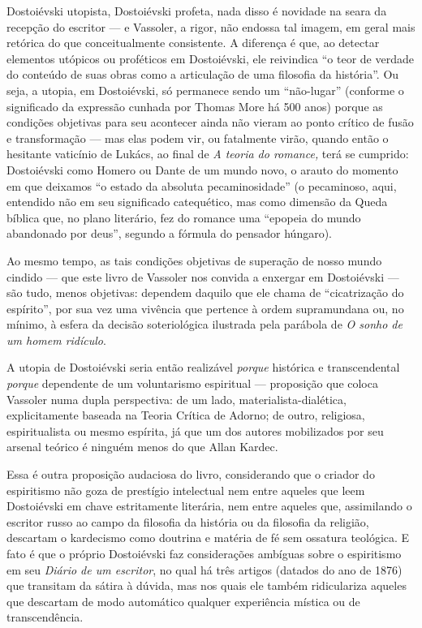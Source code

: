 Dostoiévski utopista, Dostoiévski profeta, nada disso é novidade na
seara da recepção do escritor --- e Vassoler, a rigor, não endossa tal
imagem, em geral mais retórica do que conceitualmente consistente. A
diferença é que, ao detectar elementos utópicos ou proféticos em
Dostoiévski, ele reivindica ``o teor de verdade do conteúdo de suas
obras como a articulação de uma filosofia da história''. Ou seja, a
utopia, em Dostoiévski, só permanece sendo um ``não-lugar'' (conforme o
significado da expressão cunhada por Thomas More há 500 anos) porque as
condições objetivas para seu acontecer ainda não vieram ao ponto crítico
de fusão e transformação --- mas elas podem vir, ou fatalmente virão,
quando então o hesitante vaticínio de Lukács, ao final de \emph{A teoria
do romance,} terá se cumprido: Dostoiévski como Homero ou Dante de um
mundo novo, o arauto do momento em que deixamos ``o estado da absoluta
pecaminosidade'' (o pecaminoso, aqui, entendido não em seu significado
catequético, mas como dimensão da Queda bíblica que, no plano literário,
fez do romance uma ``epopeia do mundo abandonado por deus'', segundo a
fórmula do pensador húngaro).

Ao mesmo tempo, as tais condições objetivas de superação de nosso mundo
cindido --- que este livro de Vassoler nos convida a enxergar em
Dostoiévski --- são tudo, menos objetivas: dependem daquilo que ele chama
de ``cicatrização do espírito'', por sua vez uma vivência que pertence à
ordem supramundana ou, no mínimo, à esfera da decisão soteriológica
ilustrada pela parábola de \emph{O sonho de um homem ridículo}.

A utopia de Dostoiévski seria então realizável \emph{porque} histórica e
transcendental \emph{porque} dependente de um voluntarismo espiritual ---
proposição que coloca Vassoler numa dupla perspectiva: de um lado,
materialista-dialética, explicitamente baseada na Teoria Crítica de
Adorno; de outro, religiosa, espiritualista ou mesmo espírita, já que um
dos autores mobilizados por seu arsenal teórico é ninguém menos do que
Allan Kardec.

Essa é outra proposição audaciosa do livro, considerando que o criador
do espiritismo não goza de prestígio intelectual nem entre aqueles que
leem Dostoiévski em chave estritamente literária, nem entre aqueles que,
assimilando o escritor russo ao campo da filosofia da história ou da
filosofia da religião, descartam o kardecismo como doutrina e matéria de
fé sem ossatura teológica. E fato é que o próprio Dostoiévski faz
considerações ambíguas sobre o espiritismo em seu \emph{Diário de um
escritor}, no qual há três artigos (datados do ano de 1876) que
transitam da sátira à dúvida, mas nos quais ele também ridiculariza
aqueles que descartam de modo automático qualquer experiência mística ou
de transcendência.

